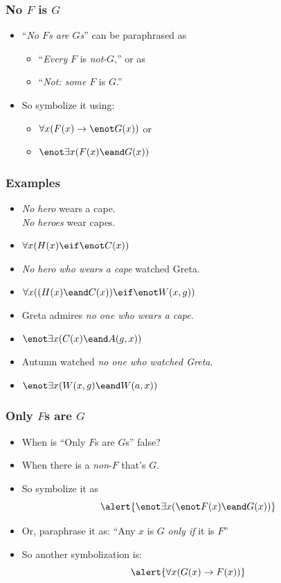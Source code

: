 \begin{frame}
\frametitle{No $F$ is $G$}

\begin{itemize}[<+->]
  \item ``\emph{No $F$s are $G$s}'' can be paraphrased as 
\begin{itemize}[<+->]
  \item ``\emph{Every} $F$ is \emph{not}-$G$,'' or as
  \item ``\emph{Not: some} $F$ is $G$.''
  \end{itemize}
  \item So symbolize it using:
\begin{itemize}
  \item \emph{$\forall x(F(x) \to \enot G(x))$} or
  \item \emph{$\enot\exists x(F(x) \eand G(x))$}
\end{itemize}
\end{itemize}

\end{frame}

\begin{frame}
\frametitle{Examples}

\begin{itemize}[<+->]
  \item \emph{No hero} wears a cape.\\
  \emph{No heroes} wear capes.\\
  \item[] \alert{$\forall x(H(x) \eif \enot C(x))$}
  \item \emph{No hero who wears a cape} watched Greta.\\
  \item[] \alert{$\forall x((H(x) \eand C(x)) \eif \enot W(x,g))$}
  \item Greta admires \emph{no one who wears a cape}.
  \item[] \alert{$\enot\exists x(C(x) \eand A(g,x))$}
  \item Autumn watched \emph{no one who watched Greta}.
  \item[] \alert{$\enot\exists x(W(x,g) \eand W(a,x))$}
\end{itemize}
\end{frame}


\begin{frame}
\frametitle{Only $F$s are $G$}

\begin{itemize}[<+->]
\item When is ``Only $F$s are $G$s'' false?
\item When there is a \emph{non}-$F$ that's $G$.
\item So symbolize it as
\[
  \alert{\enot\exists x(\enot F(x) \eand G(x))}
  \]
\item Or, paraphrase it as: ``Any $x$ is $G$ \emph{only if} it is $F$''
\item So another symbolization is:
\[
  \alert{\forall x(G(x) \to F(x))}
\]
\end{itemize}
\end{frame}

